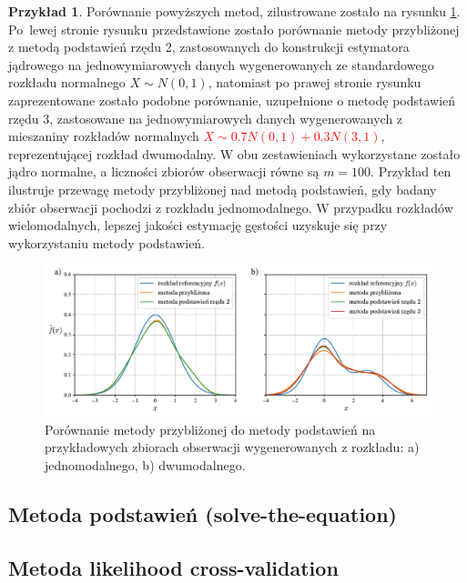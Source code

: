 \documentclass[12pt,a4paper,oneside]{book}
\theoremstyle{definition}
\newtheorem{exmp}{Przykład}[chapter]
\begin{document}
\begin{exmp}
Porównanie powyższych metod, zilustrowane zostało na rysunku \ref{fig:bandwidth_selection}. Po~lewej stronie rysunku przedstawione zostało porównanie metody przybliżonej z metodą podstawień rzędu 2, zastosowanych do konstrukcji estymatora jądrowego na jednowymiarowych danych wygenerowanych ze standardowego rozkładu normalnego $X \sim N(0,1)$, natomiast po prawej stronie rysunku zaprezentowane zostało podobne porównanie, uzupełnione o metodę podstawień rzędu 3, zastosowane na jednowymiarowych danych wygenerowanych z mieszaniny rozkładów normalnych \textcolor{red}{$X \sim 0.7 N(0,1) + 0.3 N(3,1)$}, reprezentującej rozkład dwumodalny. W obu zestawieniach wykorzystane zostało jądro normalne, a liczności zbiorów obserwacji równe są $m=100$. Przykład ten ilustruje przewagę metody przybliżonej nad metodą podstawień, gdy badany zbiór obserwacji pochodzi z rozkładu jednomodalnego. W przypadku rozkładów wielomodalnych, lepszej jakości estymację gęstości uzyskuje się przy wykorzystaniu metody podstawień.

\begin{figure}[H]
    \centering
    \includegraphics[scale=0.6]{bandwidth_selection}
    \vspace{-0.5cm} 
    \caption{Porównanie metody przybliżonej do metody podstawień na przykładowych zbiorach obserwacji wygenerowanych z rozkładu: a) jednomodalnego, b) dwumodalnego.}
    \label{fig:bandwidth_selection}
\end{figure}
\end{exmp}

\subsection*{Metoda podstawień (solve-the-equation)}

\subsection*{Metoda likelihood cross-validation}
\end{document}
